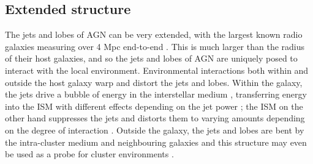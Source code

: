     \subsection{Extended structure}
    \label{sec:extended-structure-of-agn}

        The jets and lobes of AGN can be very extended, with the largest known radio galaxies measuring over 4 Mpc end-to-end \citep{machalski_understanding_2011}. This is much larger than the radius of their host galaxies, and so the jets and lobes of AGN are uniquely posed to interact with the local environment. Environmental interactions both within and outside the host galaxy warp and distort the jets and lobes. Within the galaxy, the jets drive a bubble of energy in the interstellar medium \citep[ISM;][]{mukherjee_relativistic_2016}, transferring energy into the ISM with different effects depending on the jet power \citep{mukherjee_relativistic_2018}; the ISM on the other hand suppresses the jets and distorts them to varying amounts depending on the degree of interaction \citep{mukherjee_relativistic_2018}. Outside the galaxy, the jets and lobes are bent by the intra-cluster medium and neighbouring galaxies \citep[ICM;][]{garon_radio_2019, rodman_radio_2019} and this structure may even be used as a probe for cluster environments \citep{banfield_radio_2016,sakelliou_3c40_2008}.

